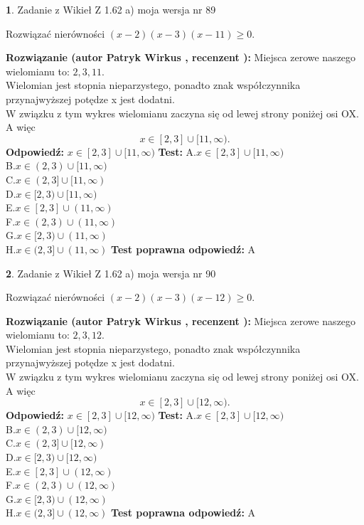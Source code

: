 \documentclass[12pt, a4paper]{article}
\theoremstyle{definition} %
\newtheorem{zad}{}
\newcommand{\zadStart}[1]{\begin{zad}#1\newline}
\newcommand{\zadStop}{\end{zad}}
\newcommand{\rozwStart}[2]{\noindent \textbf{Rozwiązanie (autor #1 , recenzent #2): }\newline}
\newcommand{\rozwStop}{\newline}
\newcommand{\odpStart}{\noindent \textbf{Odpowiedź:}\newline}
\newcommand{\odpStop}{\newline}
\newcommand{\testStart}{\noindent \textbf{Test:}\newline}
\newcommand{\testStop}{\newline}
\newcommand{\kluczStart}{\noindent \textbf{Test poprawna odpowiedź:}\newline}
\newcommand{\kluczStop}{\newline}
\begin{document}
\zadStart{Zadanie z Wikieł Z 1.62 a) moja wersja nr 89}

Rozwiązać nierówności $(x-2)(x-3)(x-11)\ge0$.
\zadStop
\rozwStart{Patryk Wirkus}{}
Miejsca zerowe naszego wielomianu to: $2, 3, 11$.\\
Wielomian jest stopnia nieparzystego, ponadto znak współczynnika przy\linebreak najwyższej potędze x jest dodatni.\\ W związku z tym wykres wielomianu zaczyna się od lewej strony poniżej osi OX. A więc $$x \in [2,3] \cup [11,\infty).$$
\rozwStop
\odpStart
$x \in [2,3] \cup [11,\infty)$
\odpStop
\testStart
A.$x \in [2,3] \cup [11,\infty)$\\
B.$x \in (2,3) \cup [11,\infty)$\\
C.$x \in (2,3] \cup [11,\infty)$\\
D.$x \in [2,3) \cup [11,\infty)$\\
E.$x \in [2,3] \cup (11,\infty)$\\
F.$x \in (2,3) \cup (11,\infty)$\\
G.$x \in [2,3) \cup (11,\infty)$\\
H.$x \in (2,3] \cup (11,\infty)$
\testStop
\kluczStart
A
\kluczStop



\zadStart{Zadanie z Wikieł Z 1.62 a) moja wersja nr 90}

Rozwiązać nierówności $(x-2)(x-3)(x-12)\ge0$.
\zadStop
\rozwStart{Patryk Wirkus}{}
Miejsca zerowe naszego wielomianu to: $2, 3, 12$.\\
Wielomian jest stopnia nieparzystego, ponadto znak współczynnika przy\linebreak najwyższej potędze x jest dodatni.\\ W związku z tym wykres wielomianu zaczyna się od lewej strony poniżej osi OX. A więc $$x \in [2,3] \cup [12,\infty).$$
\rozwStop
\odpStart
$x \in [2,3] \cup [12,\infty)$
\odpStop
\testStart
A.$x \in [2,3] \cup [12,\infty)$\\
B.$x \in (2,3) \cup [12,\infty)$\\
C.$x \in (2,3] \cup [12,\infty)$\\
D.$x \in [2,3) \cup [12,\infty)$\\
E.$x \in [2,3] \cup (12,\infty)$\\
F.$x \in (2,3) \cup (12,\infty)$\\
G.$x \in [2,3) \cup (12,\infty)$\\
H.$x \in (2,3] \cup (12,\infty)$
\testStop
\kluczStart
A
\kluczStop
\end{document}
